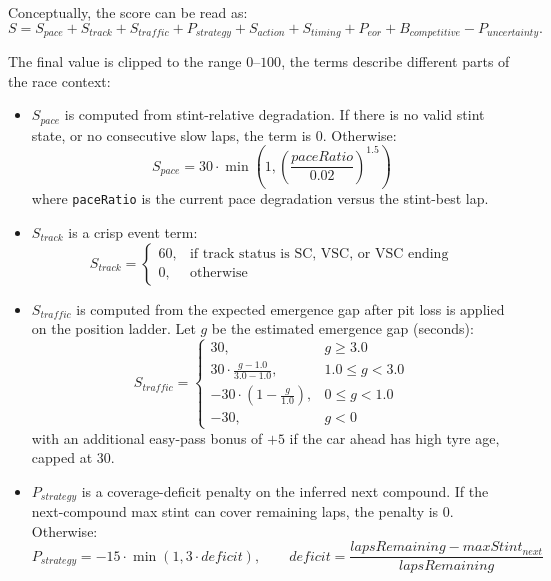 Conceptually, the score can be read as:
\[
    S =
    S_{pace}
    + S_{track}
    + S_{traffic}
    + P_{strategy}
    + S_{action}
    + S_{timing}
    + P_{eor}
    + B_{competitive}
    - P_{uncertainty}.
\]

The final value is clipped to the range $0$--$100$, the terms describe different parts of the race context:

\begin{itemize}
    \item $S_{pace}$ is computed from stint-relative degradation. If there is no valid stint state, or no consecutive slow laps, the term is $0$. Otherwise:
          \[
              S_{pace} = 30 \cdot \min\!\left(1,\left(\frac{paceRatio}{0.02}\right)^{1.5}\right)
          \]
          where \texttt{paceRatio} is the current pace degradation versus the stint-best lap.
    \item $S_{track}$ is a crisp event term:
          \[
              S_{track} =
              \begin{cases}
                  60, & \text{if track status is SC, VSC, or VSC ending} \\
                  0,  & \text{otherwise}
              \end{cases}
          \]
    \item $S_{traffic}$ is computed from the expected emergence gap after pit loss is applied on the position ladder. Let $g$ be the estimated emergence gap (seconds):
          \[
              S_{traffic} =
              \begin{cases}
                  30,                                     & g \geq 3.0       \\
                  30 \cdot \frac{g-1.0}{3.0-1.0},         & 1.0 \leq g < 3.0 \\
                  -30 \cdot \left(1-\frac{g}{1.0}\right), & 0 \leq g < 1.0   \\
                  -30,                                    & g < 0
              \end{cases}
          \]
          with an additional easy-pass bonus of $+5$ if the car ahead has high tyre age, capped at $30$.
    \item $P_{strategy}$ is a coverage-deficit penalty on the inferred next compound. If the next-compound max stint can cover remaining laps, the penalty is $0$. Otherwise:
          \[
              P_{strategy} = -15 \cdot \min(1, 3 \cdot deficit),\qquad
              deficit = \frac{lapsRemaining - maxStint_{next}}{lapsRemaining}
\]
\end{itemize}
